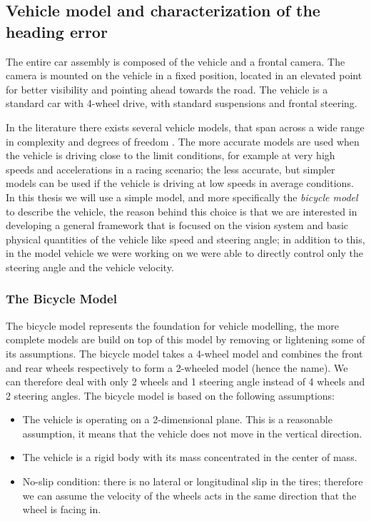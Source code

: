 \documentclass[a4paper,12pt,sort&compress]{article}
\begin{document}
\subsection{Vehicle model and characterization of the heading error}
    The entire car assembly is composed of the vehicle and a frontal camera. The
    camera is mounted on the vehicle in a fixed position, located in an elevated
    point for better visibility and pointing ahead towards the road. The vehicle
    is a standard car with 4-wheel drive, with standard suspensions and frontal
    steering.

    In the literature there exists several vehicle models, that span across a
    wide range in complexity and degrees of freedom \citep{doi:10.1080/00423119508969086}. The more accurate
    models are used when the vehicle is driving close to the limit conditions,
    for example at very high speeds and accelerations in a racing scenario; the
    less accurate, but simpler models can be used if the vehicle is driving at
    low speeds in average conditions. In this thesis we will use a simple model,
    and more specifically the \textit{bicycle model} \citep{7995816} to describe the vehicle,
    the reason behind this choice is that we are interested in developing a
    general framework that is focused on the vision system and basic physical
    quantities of the vehicle like speed and steering angle; in addition to
    this, in the model vehicle we were working on we were able to directly
    control only the steering angle and the vehicle velocity. 

    \subsubsection{The Bicycle Model}
    The bicycle model represents the foundation for vehicle modelling,
    the more complete models are build on top of this model by removing or
    lightening some of its assumptions. 
    The bicycle model takes a 4-wheel model and combines the front and rear
    wheels respectively to form a 2-wheeled model (hence the name). We can
    therefore deal with only 2 wheels and 1 steering angle instead of 4 wheels
    and 2 steering angles. 
    The bicycle model is based on the following assumptions:
    \begin{itemize}
        \item The vehicle is operating on a 2-dimensional plane. This is a reasonable assumption, it means that the vehicle
        does not move in the vertical direction.
        \item The vehicle is a rigid body with its mass concentrated in the center of mass.
        \item No-slip condition: there is no lateral or longitudinal slip in the
        tires; therefore we can assume the velocity of the wheels acts in the same
        direction that the wheel is facing in. 
    \end{itemize}
\end{document}
